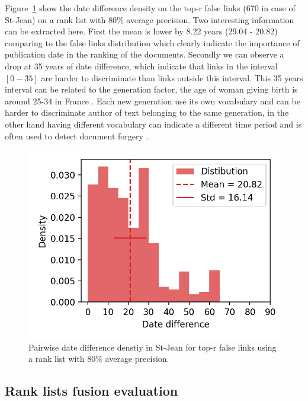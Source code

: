 Figure~\ref{fig:dates_differences_r_false} show the date difference density on the top-r false links (670 in case of St-Jean) on a rank list with 80\% average precision.
Two interesting information can be extracted here.
First the mean is lower by 8.22 years (29.04 - 20.82) comparing to the false links distribution which clearly indicate the importance of publication date in the ranking of the documents.
Secondly we can observe a drop at 35 years of date difference, which indicate that links in the interval $\left[0-35\right]$ are harder to discriminate than links outside this interval.
This 35 years interval can be related to the generation factor, the age of woman giving birth is around 25-34 in France \cite{generations}.
Each new generation use its own vocabulary and can be harder to discriminate author of text belonging to the same generation, in the other hand having different vocabulary can indicate a different time period and is often used to detect document forgery \cite{savoy_stylo}.

\begin{figure}
  \includegraphics[width=\linewidth]{img/dates_differences_r_false.png}
  \caption{Pairwise date difference denstiy in St-Jean for top-r false links using a rank list with 80\% average precision.}
  \label{fig:dates_differences_r_false}
\end{figure}

\subsection{Rank lists fusion evaluation}

